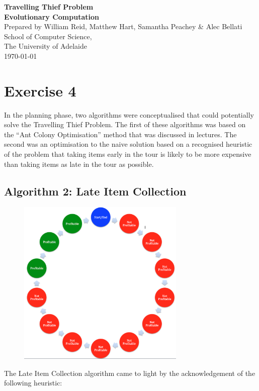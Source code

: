 \documentclass[a4paper,12pt]{article}
\begin{document}
\begin{center}
{\LARGE\bf Travelling Thief Problem}\\
\vspace{0.5cm}
{\Large\bf Evolutionary Computation}\\
\vspace{1cm}
Prepared by William Reid, Matthew Hart, Samantha Peachey \& Alec Bellati\\
\vspace{1cm}
School of Computer Science,\\
The University of Adelaide\\
\vspace{1cm}
\today
\end{center}



\section*{Exercise 4}
In the planning phase, two algorithms were conceptualised that could potentially solve the Travelling Thief Problem. The first of these algorithms was based on the ``Ant Colony Optimisation'' method that was discussed in lectures. The second was an optimisation to the naive solution based on a recognised heuristic of the problem that taking items early in the tour is likely to be more expensive than taking items as late in the tour as possible.

\subsection*{Algorithm 2: Late Item Collection}
\begin{figure}[h]
\centering
\includegraphics[width=80mm]{AlgorithmIdea.png}
\end{figure}
The Late Item Collection algorithm came to light by the acknowledgement of the following heuristic:
\end{document}
